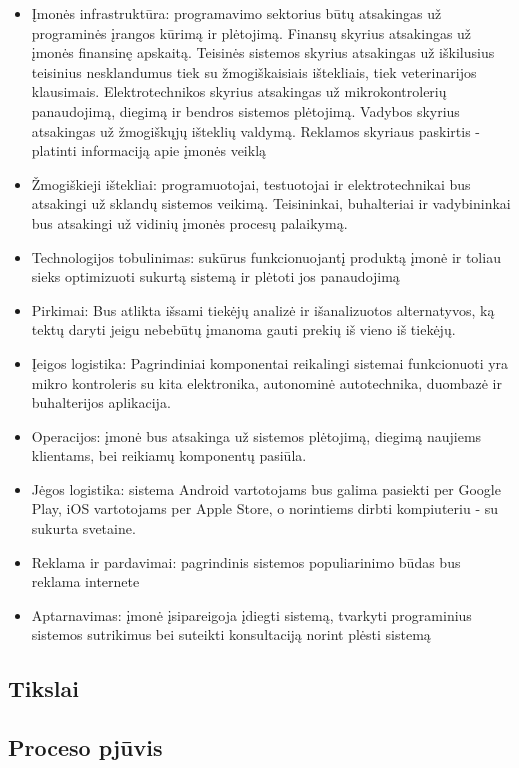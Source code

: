 \documentclass[oneside]{VUMIFPSkursinis}
\begin{document}
	\begin{itemize}
		\item{Įmonės infrastruktūra: programavimo sektorius būtų atsakingas už programinės įrangos kūrimą ir plėtojimą. Finansų skyrius atsakingas už įmonės finansinę apskaitą. Teisinės sistemos skyrius atsakingas už iškilusius teisinius nesklandumus tiek su žmogiškaisiais ištekliais, tiek veterinarijos klausimais. Elektrotechnikos skyrius atsakingas už mikrokontrolerių panaudojimą, diegimą ir bendros sistemos plėtojimą. Vadybos skyrius atsakingas už žmogiškųjų išteklių valdymą. Reklamos skyriaus paskirtis - platinti informaciją apie įmonės veiklą }
		\item{Žmogiškieji ištekliai: programuotojai, testuotojai ir elektrotechnikai bus atsakingi už sklandų sistemos veikimą. Teisininkai, buhalteriai ir vadybininkai bus atsakingi už vidinių įmonės procesų palaikymą. }
		\item{Technologijos tobulinimas: sukūrus funkcionuojantį produktą įmonė ir toliau sieks optimizuoti sukurtą sistemą ir plėtoti jos panaudojimą }
		\item{Pirkimai: Bus atlikta išsami tiekėjų analizė ir išanalizuotos alternatyvos, ką tektų daryti jeigu nebebūtų įmanoma gauti prekių iš vieno iš tiekėjų.}
		\item{Įeigos logistika: Pagrindiniai komponentai reikalingi sistemai funkcionuoti yra mikro kontroleris su kita elektronika, autonominė autotechnika, duombazė ir buhalterijos aplikacija.}
		\item{Operacijos: įmonė bus atsakinga už sistemos plėtojimą, diegimą naujiems klientams, bei reikiamų komponentų pasiūla.}
		\item{Jėgos logistika: sistema Android vartotojams bus galima pasiekti per Google Play, iOS vartotojams per Apple Store, o norintiems dirbti kompiuteriu - su sukurta svetaine.}
		\item{Reklama ir pardavimai: pagrindinis sistemos populiarinimo būdas bus reklama internete}
		\item{Aptarnavimas: įmonė įsipareigoja įdiegti sistemą, tvarkyti programinius sistemos sutrikimus bei suteikti konsultaciją norint plėsti sistemą }


	\end{itemize}

	
	\subsection{Tikslai}
	\subsection{Proceso pjūvis}
\end{document}
